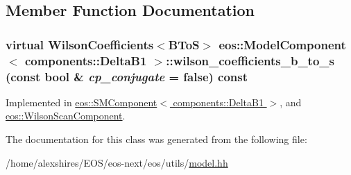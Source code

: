 \subsection{Member Function Documentation}
\hypertarget{classeos_1_1ModelComponent_3_01components_1_1DeltaB1_01_4_a94a836d0f2518023cca37a1ffaa128e9}{
\subsubsection[{wilson\_\-coefficients\_\-b\_\-to\_\-s}]{\setlength{\rightskip}{0pt plus 5cm}virtual WilsonCoefficients$<${\bf BToS}$>$ eos::ModelComponent$<$ components::DeltaB1 $>$::wilson\_\-coefficients\_\-b\_\-to\_\-s (const bool \& {\em cp\_\-conjugate} = {\ttfamily false}) const}}
\label{classeos_1_1ModelComponent_3_01components_1_1DeltaB1_01_4_a94a836d0f2518023cca37a1ffaa128e9}


Implemented in \hyperlink{classeos_1_1SMComponent_3_01components_1_1DeltaB1_01_4_a4a3c9906daaf0be6c682245e0467a316}{eos::SMComponent$<$ components::DeltaB1 $>$}, and \hyperlink{classeos_1_1WilsonScanComponent_afcad159e4ff8fa11d5ea4a5d41f534ad}{eos::WilsonScanComponent}.

The documentation for this class was generated from the following file:\begin{DoxyCompactItemize}
\item 
/home/alexshires/EOS/eos-\/next/eos/utils/\hyperlink{model_8hh}{model.hh}\end{DoxyCompactItemize}
